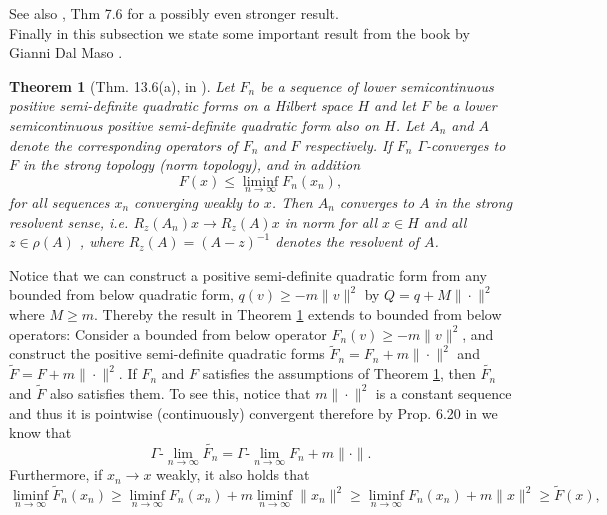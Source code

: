 \documentclass[a4paper,11pt]{article}
\newcommand{\ie}{\emph{i.e.} }
\newcommand{\Glim}{\Gamma\text{-}\lim}
\newtheorem{theorem}{Theorem}
\numberwithin{equation}{section}
\begin{document}
See also \cite{JPS_lecturenotes}, Thm 7.6 for a possibly even stronger result.\\
Finally in this subsection we state some important result from the book by Gianni Dal Maso \cite{maso1993introduction}.
\begin{theorem}[Thm. 13.6(a), in \cite{maso1993introduction}]\label{Gamma conv. and strong res. conv. Thm}
	Let $ F_n $ be a sequence of lower semicontinuous positive semi-definite quadratic forms on a Hilbert space $ H $ and let $ F $ be a lower semicontinuous positive semi-definite quadratic form also on $ H $. Let $ A_n $ and $ A $ denote the corresponding operators of $ F_n $ and $ F $ respectively. If $ F_n $ $ \Gamma $-converges to $ F $ in the strong topology (norm topology), and in addition \begin{equation}
	F(x)\leq\liminf_{n\to\infty}F_n(x_n),
	\end{equation}
	for all sequences $ x_n $ converging weakly to $ x $. Then $ A_n $ converges to $ A $ in the strong resolvent sense, \ie $ R_z(A_n)x\to R_z(A)x $ in norm for all $ x\in H $ and all $ z\in\rho(A)$ , where $ R_z(A)=(A-z)^{-1} $ denotes the resolvent of $ A $.
\end{theorem}
Notice that we can construct a positive semi-definite quadratic form from any bounded from below quadratic form, $ q(v)\geq-m\|v\|^2 $ by $ Q=q+M\|\cdot\|^2 $ where $ M\geq m $. Thereby the result in Theorem \ref{Gamma conv. and strong res. conv. Thm} extends to bounded from below operators: Consider a bounded from below operator $ F_n(v)\geq-m\|v\|^2 $, and construct the positive semi-definite quadratic forms $ \tilde{F}_n=F_n+m\|\cdot\|^2 $ and $ \tilde{F}=F+m\|\cdot\|^2 $. If $ F_n $ and $ F $ satisfies the assumptions of Theorem \ref{Gamma conv. and strong res. conv. Thm}, then $ \tilde{F_n} $ and $ \tilde{F} $ also satisfies them. To see this, notice that $ m\|\cdot\|^2 $ is a constant sequence and thus it is pointwise (continuously) convergent therefore by Prop. 6.20 in \cite{maso1993introduction} we know that\begin{equation}
\Glim_{n\to\infty}\tilde{F_n}=\Glim_{n\to\infty} F_n+m\|\cdot\|.
\end{equation} 
Furthermore, if $ x_n\to x $ weakly, it also holds that \begin{equation}
\liminf_{n\to\infty}\tilde{F}_n(x_n)\geq\liminf_{n\to\infty}F_n(x_n)+m\liminf_{n\to\infty}\|x_n\|^2\geq\liminf_{n\to\infty}F_n(x_n)+m\|x\|^2\geq\tilde{F}(x),
\end{equation}
\end{document}
